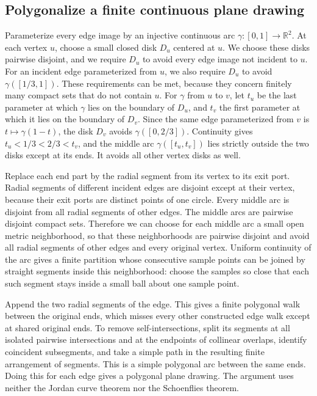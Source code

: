 \documentclass[11pt]{article}
\begin{document}
\subsection{Polygonalize a finite continuous plane drawing}

Parameterize every edge image by an injective continuous arc
$\gamma\colon[0,1]\to\mathbb R^2$. At each vertex $u$, choose a small closed
disk $D_u$ centered at $u$. We choose these disks pairwise disjoint, and we
require $D_u$ to avoid every edge image not incident to $u$. For an incident
edge parameterized from $u$, we also require $D_u$ to avoid
$\gamma([1/3,1])$. These requirements can be met, because they concern finitely
many compact sets that do not contain $u$. For $\gamma$ from $u$ to $v$, let
$t_u$ be the last parameter at which $\gamma$ lies on the boundary of $D_u$, and
$t_v$ the first parameter at which it lies on the boundary of $D_v$. Since the
same edge parameterized from $v$ is $t\mapsto\gamma(1-t)$, the disk $D_v$ avoids
$\gamma([0,2/3])$. Continuity gives $t_u<1/3<2/3<t_v$, and the middle arc
$\gamma([t_u,t_v])$ lies strictly outside the two disks except at its ends. It
avoids all other vertex disks as well.

Replace each end part by the radial segment from its vertex to its exit port.
Radial segments of different incident edges are disjoint except at their
vertex, because their exit ports are distinct points of one circle. Every
middle arc is disjoint from all radial segments of other edges. The middle arcs
are pairwise disjoint compact sets. Therefore we can choose for each middle arc
a small open metric neighborhood, so that these neighborhoods are pairwise
disjoint and avoid all radial segments of other edges and every original
vertex. Uniform continuity of the arc gives a finite partition whose
consecutive sample points can be joined by straight segments inside this
neighborhood: choose the samples so close that each such segment stays inside a
small ball about one sample point.

Append the two radial segments of the edge. This gives a finite polygonal walk
between the original ends, which misses every other constructed edge walk
except at shared original ends. To remove self-intersections, split its
segments at all isolated pairwise intersections and at the endpoints of
collinear overlaps, identify coincident subsegments, and take a simple path in
the resulting finite arrangement of segments. This is a simple polygonal arc
between the same ends. Doing this for each edge gives a polygonal plane
drawing. The argument uses neither the Jordan curve theorem nor the
Schoenflies theorem.
\end{document}
